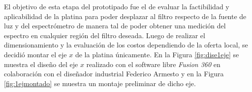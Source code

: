 El objetivo de esta etapa del prototipado fue el de evaluar la factibilidad y aplicabilidad de la platina para poder desplazar al filtro respecto de la fuente de luz y del espectrómetro de manera tal de poder obtener una medición del espectro en cualquier región del filtro deseada. Luego de realizar el dimensionamiento y la evaluación de los costos dependiendo de la oferta local, se decidió montar el eje $\textit{x}$ de la platina únicamente. En la Figura \ref{fig:dise1eje} se muestra el diseño del eje $\textit{x}$ realizado con el software libre \textit{Fusion 360} en colaboración con el diseñador industrial Federico Armesto y en la Figura \ref{fig:1ejmontado} se muestra un montaje preliminar de dicho eje. 

\begin{figure}[H]
	\begin{floatrow}

\end{floatrow}
\end{figure}
